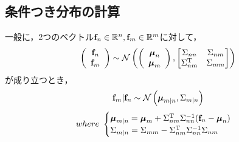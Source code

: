 \documentclass[11pt,a4j]{article}
\begin{document}
    \subsection{条件つき分布の計算}
      一般に，2つのベクトル${\bf f}_n \in \mathbb{R}^{n}, {\bf f}_m \in \mathbb{R}^{m}$に対して，
      \begin{align}
        \left(
          \begin{array}{c}
            {\bf f}_n \\ {\bf f}_m
          \end{array}
        \right)
        \sim
        \mathcal{N} 
        \left(
          \left(
            \begin{array}{c}
              {\boldsymbol \mu}_n \\ {\boldsymbol \mu}_m
            \end{array}
          \right)
          ,
          \begin{bmatrix}
            \Sigma_{nn} & \Sigma_{nm} \\
            \Sigma_{nm}^{\mathrm{T}} & \Sigma_{mm}
          \end{bmatrix}
        \right)
      \end{align}
      が成り立つとき，
      \begin{align}
        {\bf f}_m | {\bf f}_n \sim \mathcal{N}\left( {\boldsymbol \mu}_{m|n}, \Sigma_{m|n} \right) \label{form:gaussian_conditional}  
      \end{align}
      \begin{align}          
        where ~ 
        \begin{cases}
          {\boldsymbol \mu}_{m|n} = {\boldsymbol \mu}_{m} + \Sigma_{nm}^{\mathrm{T}} \Sigma_{nn}^{-1} ( {\bf f}_n - {\boldsymbol \mu}_{n} ) \\
          \Sigma_{m|n} = \Sigma_{mm} - \Sigma_{nm}^{\mathrm{T}} \Sigma_{nn}^{-1} \Sigma_{nm}
        \end{cases} \nonumber
      \end{align}
\end{document}
